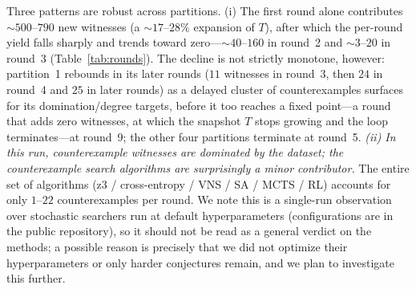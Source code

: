 \documentclass[]{ceurart}
\begin{document}
Three patterns are robust across partitions. (i) The first round alone contributes
$\sim\!500$--$790$ new witnesses (a $\sim\!17$--$28\%$ expansion of $T$), after which the
per-round yield falls sharply and trends toward zero---$\sim\!40$--$160$ in
round~2 and $\sim\!3$--$20$ in round~3 (Table~\ref{tab:rounds}). The decline is
not strictly monotone, however: partition~1 rebounds in its later rounds
($11$ witnesses in round~3, then $24$ in round~4 and $25$ in later rounds) as a delayed
cluster of counterexamples surfaces for its domination/degree targets, before it
too reaches a fixed point---a round that adds zero witnesses, at which the
snapshot $T$ stops growing and the loop terminates---at round~9; the other four
partitions terminate at round~5. \emph{(ii) In this run, counterexample witnesses are dominated by the
dataset; the counterexample search algorithms are surprisingly
a minor contributor.} The entire set of algorithms (z3 / cross-entropy / VNS / SA
/ MCTS / RL) accounts for only $1$--$22$ counterexamples per round. We note this is a
single-run observation over stochastic searchers run at default hyperparameters (configurations
are in the public repository), so it should not be read as a general verdict on the methods; a possible
reason is precisely that we did not optimize their hyperparameters or only harder conjectures remain, and we plan to investigate this further.
\end{document}
